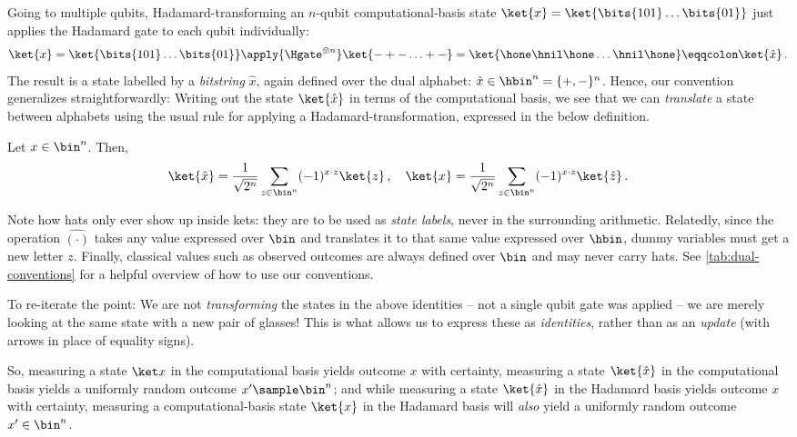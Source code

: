     Going to multiple qubits, Hadamard-transforming an
      $n$-qubit computational-basis state $\ket{x} = \ket{\bits{101} \ldots \bits{01}}$ just 
      applies the Hadamard gate to each qubit individually:
    \[
      \ket{x} = \ket{\bits{101} \ldots \bits{01}}
        \apply{\Hgate^{\otimes n}}\ket{- + - \ldots + -} 
        = \ket{\hone \hnil \hone \ldots \hnil \hone} 
        \eqqcolon \ket{\hat{x}}\, .
    \]
    The result is a state labelled by a \emph{bitstring} $\hat{x}$, 
      again defined over the dual alphabet: $\hat{x} \in \hbin^n = \{+,-\}^n$.
      Hence, our convention generalizes straightforwardly:
      Writing out the state $\ket{\hat{x}}$ in
      terms of the computational basis, we see that we can \emph{translate} a
      state between alphabets using the usual rule for applying a
      Hadamard-transformation, expressed in the below definition.
    \begin{definition}\label{def:HadamardTranslation}
      Let $x \in \bin^n$. Then,
      \[
        \ket{\hat{x}} = \frac{1}{\sqrt{2^n}} \sum_{z \in \bin^n} (-1)^{x \cdot
        z} \ket{z}\, ,
        \quad 
        \ket{x} = \frac{1}{\sqrt{2^n}} \sum_{z \in \bin^n} (-1)^{x \cdot
        z} \ket{\hat{z}}\, .
      \]
    \end{definition}
    Note how hats only ever show up inside kets: they are to be used as
      \emph{state labels}, never in the surrounding arithmetic.
      Relatedly, since the operation $\widehat{(\cdot)}$ takes any value
      expressed over $\bin$ and translates it to that same value expressed over
      $\hbin$, dummy variables must get a new letter $z$. Finally, classical
      values such as observed outcomes are always defined over $\bin$ and may never carry hats. 
      See \cref{tab:dual-conventions} for a helpful
      overview of how to use our conventions.

    To re-iterate the point: We are not \emph{transforming} the states in the
      above identities
      -- not a single qubit gate was applied -- 
      we are merely looking at the same state with a new pair of glasses!
      This is what allows us to express these as \emph{identities},
      rather than as an \emph{update} (with arrows in place of equality signs).

    So, measuring a state $\ket x$ in the computational basis yields
      outcome $x$ with certainty, measuring a state $\ket{\hat{x}}$ in the
      computational basis yields a uniformly random outcome $x^\prime \sample \bin^n$;
      and while measuring a state $\ket{\hat{x}}$ in the Hadamard basis yields
      outcome $x$ with certainty, measuring a computational-basis state $\ket{x}$ in the
      Hadamard basis will \emph{also} yield a uniformly random outcome $x^\prime \in \bin^n$.

